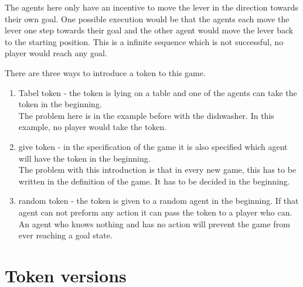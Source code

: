 
  The agents here only have an incentive to move the lever in the direction towards their own goal. One possible execution would be that the agents each move the lever one step towards their goal and the other agent would move the lever back to the starting position. This is a infinite sequence which is not successful, no player would reach any goal.

  There are three ways to introduce a token to this game.
  \begin{enumerate}
    \item Tabel token - the token is lying on a table and one of the agents can take the token in the beginning. \\
    The problem here is in the example before with the dishwasher. In this example, no player would take the token.
    \item give token - in the specification of the game it is also specified which agent will have the token in the beginning. \\
    The problem with this introduction is that in every new game, this has to be written in the definition of the game. It has to be decided in the beginning.
    \item random token - the token is given to a random agent in the beginning. If that agent can not preform any action it can pass the token to a player who can. \\
    An agent who knows nothing and has no action will prevent the game from ever reaching a goal state.
  \end{enumerate}

\section{Token versions}

